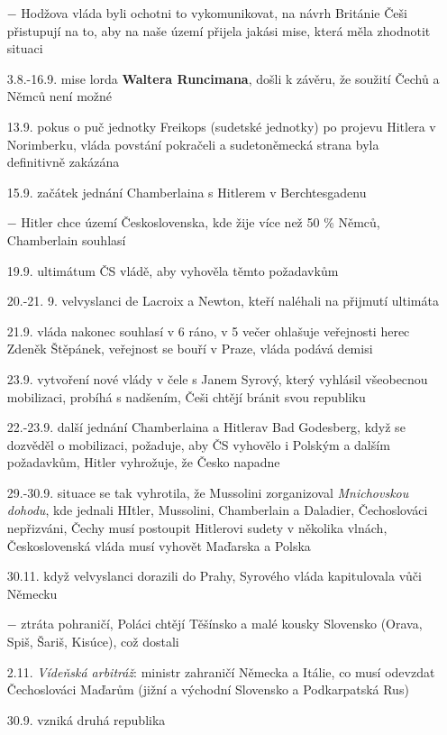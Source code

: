 \documentclass{article}
\begin{document}
\begin{itemize}
    \item[$-$] Hodžova vláda byli ochotni to vykomunikovat, na návrh Británie Češi přistupují na to, aby na naše území přijela jakási mise, která měla zhodnotit situaci
    \item[3.8.-16.9.] mise lorda \textbf{Waltera Runcimana}, došli k závěru, že soužití Čechů a Němců není možné
    \item[13.9.] pokus o puč jednotky Freikops (sudetské jednotky) po projevu Hitlera v Norimberku, vláda povstání pokračeli a sudetoněmecká strana byla definitivně zakázána
    \item[15.9.] začátek jednání Chamberlaina s Hitlerem v Berchtesgadenu
    \item[$-$] Hitler chce území Československa, kde žije více než 50 \% Němců, Chamberlain souhlasí
    \item[19.9.] ultimátum ČS vládě, aby vyhověla těmto požadavkům
    \item[20.-21. 9.] velvyslanci de Lacroix a Newton, kteří naléhali na přijmutí ultimáta
    \item[21.9.] vláda nakonec souhlasí v 6 ráno, v 5 večer ohlašuje veřejnosti herec Zdeněk Štěpánek, veřejnost se bouří v Praze, vláda podává demisi
    \item[23.9.] vytvoření nové vlády v čele s Janem Syrový, který vyhlásil všeobecnou mobilizaci, probíhá s nadšením, Češi chtějí bránit svou republiku
    \item[22.-23.9.] další jednání Chamberlaina a Hitlerav Bad Godesberg, když se dozvěděl o mobilizaci, požaduje, aby ČS vyhovělo i Polským a dalším požadavkům, Hitler  vyhrožuje, že Česko napadne
    \item[29.-30.9.] situace se tak vyhrotila, že Mussolini zorganizoval \textit{Mnichovskou dohodu}, kde jednali HItler, Mussolini, Chamberlain a Daladier, Čechoslováci nepřizváni, Čechy musí postoupit Hitlerovi sudety v několika vlnách, Československá vláda musí vyhovět Maďarska a Polska
    \item[30.11.] když velvyslanci dorazili do Prahy, Syrového vláda kapitulovala vůči Německu
    \item[$-$] ztráta pohraničí, Poláci chtějí Těšínsko a malé kousky Slovensko (Orava, Spiš, Šariš, Kisúce), což dostali
    \item[2.11.] \textit{Vídeňská arbitráž}: ministr zahraničí Německa a Itálie, co musí odevzdat Čechoslováci Maďarům (jižní a východní Slovensko a Podkarpatská Rus)
    \item[30.9.]  vzniká druhá republika
\end{itemize}
\end{document}

